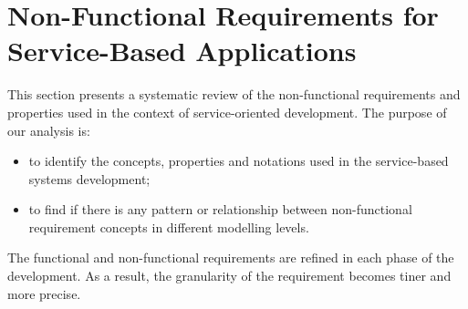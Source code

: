 \bigskip


\section{Non-Functional Requirements for Service-Based Applications}   
\label{sec:nfrs}   

This section presents a systematic review of the non-func\-tion\-al
requirements and properties used in the context of service-oriented
development. The purpose of our analysis is:
\begin{itemize}
  \item to identify the concepts, properties and notations used in the
  service-based systems development;
  \item to find if there is any pattern or relationship between non-functional
requirement concepts in different modelling levels.
\end{itemize}

The functional and non-functional requirements are refined in each phase of the
development. As a result, the granularity of the requirement becomes tiner and
more precise.








